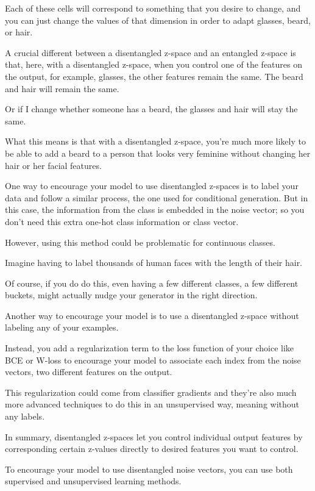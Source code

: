 \documentclass[11pt, onecolumn]{article}
\begin{document}
Each of these cells will correspond to something that you desire to change, and you can just change the values of that dimension in order to adapt glasses, beard, or hair.

A crucial different between a disentangled z-space and
an entangled z-space is that, here,
with a disentangled z-space,
when you control one of the features on the output,
for example, glasses, the other features remain the same.
The beard and hair will remain the same.

Or if I change whether someone has a beard, the glasses and hair will stay the same.

What this means is that with a disentangled z-space, you're much more likely to be able to add a beard to a person that looks very feminine without changing her hair or her facial features.

One way to encourage your model to use disentangled z-spaces is to label your data and follow a similar process, the one used for conditional generation.
But in this case, the information from the class is embedded in the noise vector; so you don't need this extra one-hot class information or class vector.

However, using this method could be problematic for continuous classes.

Imagine having to label thousands of human faces with the length of their hair.

Of course, if you do do this, even having a few different classes, a few different buckets, might actually nudge your generator in the right direction.

Another way to encourage your model is to use a disentangled z-space without
labeling any of your examples.

Instead, you add a regularization term to the loss function of your choice like BCE or W-loss to encourage your model to associate each index from the noise vectors, two different features on the output.

This regularization could come from classifier gradients and they're also much more advanced techniques to do this in an unsupervised way, meaning without any labels.

In summary, disentangled z-spaces let you control individual output features by corresponding certain z-values directly to desired features you want to control.

To encourage your model to use disentangled noise vectors, you can use both supervised and unsupervised learning methods. 
\end{document}
